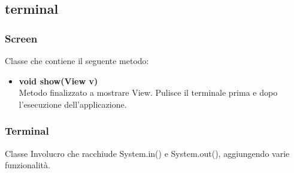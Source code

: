 \documentclass[a4paper, 12pt]{scrreprt}
\begin{document}
			\subsection{terminal}
				\subsubsection{Screen}
				Classe che contiene il seguente metodo:
				\begin{itemize}
					\item \textbf{void show(View v)}
					\\Metodo finalizzato a mostrare View. Pulisce il terminale prima e dopo l'esecuzione dell'applicazione.
				\end{itemize}

				\subsubsection{Terminal}
				Classe Involucro che racchiude System.in() e System.out(), aggiungendo varie funzionalit\`a.
\end{document}
